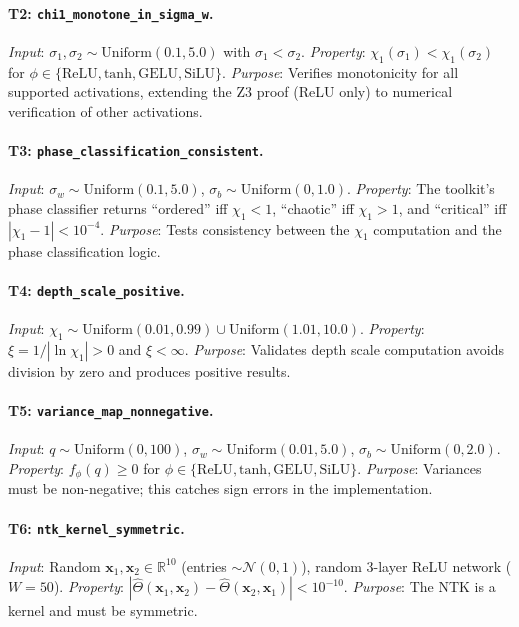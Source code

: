 \documentclass[10pt]{article}
\newcommand{\RR}{\mathbb{R}}
\begin{document}
\paragraph{T2: \texttt{chi1\_monotone\_in\_sigma\_w}.}
\emph{Input}: $\sigma_1, \sigma_2 \sim \text{Uniform}(0.1, 5.0)$ with $\sigma_1 < \sigma_2$.
\emph{Property}: $\chi_1(\sigma_1) < \chi_1(\sigma_2)$ for $\phi \in \{\text{ReLU}, \text{tanh}, \text{GELU}, \text{SiLU}\}$.
\emph{Purpose}: Verifies monotonicity for all supported activations, extending the Z3 proof (ReLU only) to numerical verification of other activations.

\paragraph{T3: \texttt{phase\_classification\_consistent}.}
\emph{Input}: $\sigma_w \sim \text{Uniform}(0.1, 5.0)$, $\sigma_b \sim \text{Uniform}(0, 1.0)$.
\emph{Property}: The toolkit's phase classifier returns ``ordered'' iff $\chi_1 < 1$, ``chaotic'' iff $\chi_1 > 1$, and ``critical'' iff $|\chi_1 - 1| < 10^{-4}$.
\emph{Purpose}: Tests consistency between the $\chi_1$ computation and the phase classification logic.

\paragraph{T4: \texttt{depth\_scale\_positive}.}
\emph{Input}: $\chi_1 \sim \text{Uniform}(0.01, 0.99) \cup \text{Uniform}(1.01, 10.0)$.
\emph{Property}: $\xi = 1/|\ln \chi_1| > 0$ and $\xi < \infty$.
\emph{Purpose}: Validates depth scale computation avoids division by zero and produces positive results.

\paragraph{T5: \texttt{variance\_map\_nonnegative}.}
\emph{Input}: $q \sim \text{Uniform}(0, 100)$, $\sigma_w \sim \text{Uniform}(0.01, 5.0)$, $\sigma_b \sim \text{Uniform}(0, 2.0)$.
\emph{Property}: $f_\phi(q) \geq 0$ for $\phi \in \{\text{ReLU}, \text{tanh}, \text{GELU}, \text{SiLU}\}$.
\emph{Purpose}: Variances must be non-negative; this catches sign errors in the implementation.

\paragraph{T6: \texttt{ntk\_kernel\_symmetric}.}
\emph{Input}: Random $\mathbf{x}_1, \mathbf{x}_2 \in \RR^{10}$ (entries $\sim \mathcal{N}(0,1)$), random 3-layer ReLU network ($W=50$).
\emph{Property}: $|\hat{\Theta}(\mathbf{x}_1, \mathbf{x}_2) - \hat{\Theta}(\mathbf{x}_2, \mathbf{x}_1)| < 10^{-10}$.
\emph{Purpose}: The NTK is a kernel and must be symmetric.
\end{document}
